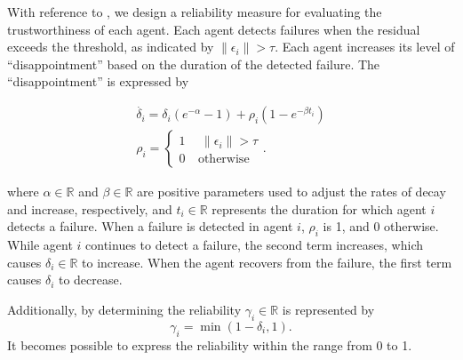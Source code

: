 \documentclass[a4paper,fleqn,10pt,twocolumn]{SICE_ISCS}
\begin{document}
With reference to \cite{Affection}, we design a reliability measure for evaluating the trustworthiness of each agent. Each agent detects failures when the residual exceeds the threshold, as indicated by $\|\epsilon_i\|>\tau$. Each agent increases its level of  ``disappointment'' based on the duration of the detected failure. The ``disappointment'' is expressed by

\begin{align}	
	\dot{\delta_i}=\delta_i(e^{-\alpha}-1)+\rho_i(1-e^{-\beta t_i})\\
	\rho_{i}=
	\begin{cases}
		1 &\ \ \|\epsilon_i\|> \tau \\
		0 &	\ \mathrm{otherwise}
	\end{cases}.
\end{align}

\noindent where $\alpha\in\mathbb{R}$ and $\beta\in\mathbb{R}$ are positive parameters used to adjust the rates of decay and increase, respectively, and $t_i\in\mathbb{R}$ represents the duration for which agent $i$ detects a failure. When a failure is detected in agent $i$, $\rho_i$ is 1, and 0 otherwise. While agent $i$ continues to detect a failure, the second term increases, which causes $\delta_i\in\mathbb{R}$ to increase. When the agent recovers from the failure, the first term causes $\delta_i$ to decrease.

Additionally, by determining the reliability \(\gamma_i \in \mathbb{R}\) is represented by 
\begin{equation}
	\gamma_i=\min(1-\delta_i,1).
\end{equation}	
It becomes possible to express the reliability within the range from 0 to 1.
\end{document}
